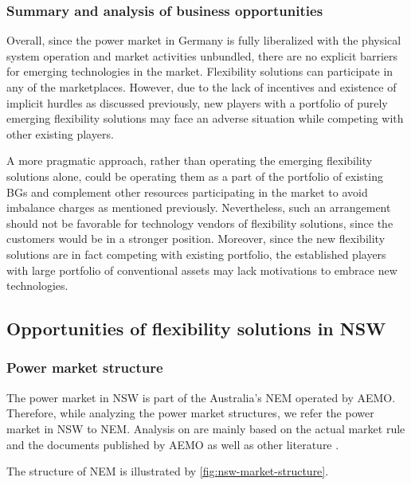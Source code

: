\subsubsection{Summary and analysis of business opportunities}

Overall, since the power market in Germany is fully liberalized with the physical system operation and market activities unbundled, there are no explicit barriers for emerging technologies in the market. Flexibility solutions can participate in any of the marketplaces. However, due to the lack of incentives and existence of implicit hurdles as discussed previously, new players with a portfolio of purely emerging flexibility solutions may face an adverse situation while competing with other existing players.

A more pragmatic approach, rather than operating the emerging flexibility solutions alone, could be operating them as a part of the portfolio of existing BGs and complement other resources participating in the market to avoid imbalance charges as mentioned previously. Nevertheless, such an arrangement should not be favorable for technology vendors of flexibility solutions, since the customers would be in a stronger position. Moreover, since the new flexibility solutions are in fact competing with existing portfolio, the established players with large portfolio of conventional assets may lack motivations to embrace new technologies.

\subsection{Opportunities of flexibility solutions in NSW}

\subsubsection{Power market structure}

The power market in NSW is part of the Australia's NEM operated by AEMO. Therefore, while analyzing the power market structures, we refer the power market in NSW to NEM. Analysis on are mainly based on the actual market rule \cite{AEMC_rule} and the documents published by AEMO \cite{AEMO2010,AEMO2013,AEMO2015,AEMO_DR_1,AEMO_web} as well as other literature \cite{Wang2015,Brown2015,Srivastava2011,NortheastGroup2017a}.

The structure of NEM is illustrated by \ref{fig:nsw-market-structure}.

